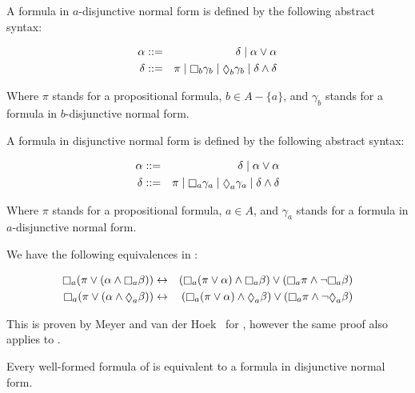 \begin{definition}
A formula in $a$-disjunctive normal form is defined by the following abstract syntax:

\begin{eqnarray*}
\alpha &::=& \delta \bnfalt \alpha \lor \alpha\\
\delta &::=& \pi \bnfalt \knows_b \gamma_b \bnfalt \suspects_b \gamma_b \bnfalt
\delta \land \delta\\
\end{eqnarray*}

Where $\pi$ stands for a propositional formula, $b \in A - \{a\}$, and
$\gamma_b$ stands for a formula in $b$-disjunctive normal form.

A formula in disjunctive normal form is defined by the following abstract syntax:

\begin{eqnarray*}
\alpha &::=& \delta \bnfalt \alpha \lor \alpha\\
\delta &::=& \pi \bnfalt \knows_a \gamma_a \bnfalt \suspects_a \gamma_a \bnfalt
\delta \land \delta\\
\end{eqnarray*}

Where $\pi$ stands for a propositional formula, $a \in A$, and $\gamma_a$
stands for a formula in $a$-disjunctive normal form.
\end{definition}

\begin{lemma}\label{kd45-dnf-equivalences}
We have the following equivalences in \logicKD{}:

\begin{eqnarray*}
\knows_a (\pi \lor (\alpha \land \knows_a \beta)) &\iff& (\knows_a (\pi \lor \alpha)
\land \knows_a \beta) \lor (\knows_a \pi \land \neg \knows_a \beta)\\
\knows_a (\pi \lor (\alpha \land \suspects_a \beta)) &\iff& (\knows_a (\pi \lor \alpha)
\land \suspects_a \beta) \lor (\knows_a \pi \land \neg \suspects_a \beta)
\end{eqnarray*}
\end{lemma}

This is proven by Meyer and van der Hoek~\cite{meyer2004epistemic} for
\logicSi{}, however the same proof also applies to \logicKD{}.

\begin{lemma}\label{kd45-dnf}
Every well-formed formula of \logicKD{} is equivalent to a formula in
disjunctive normal form.
\end{lemma}

